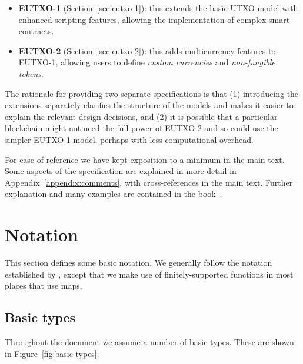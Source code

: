 \documentclass[a4paper]{article}
\begin{document}
\begin{itemize}
  \item \textbf{EUTXO-1} (Section~\ref{sec:eutxo-1}): this extends the
    basic UTXO model with enhanced scripting features, allowing the
    implementation of complex smart contracts.
  \item \textbf{EUTXO-2} (Section~\ref{sec:eutxo-2}): this adds
    multicurrency features to EUTXO-1, allowing users to define
    \textit{custom currencies} and \textit{non-fungible tokens}.
\end{itemize}


\medskip

The rationale for providing two separate specifications is that (1)
introducing the extensions separately clarifies the structure of the
models and makes it easier to explain the relevant design decisions,
and (2) it is possible that a particular blockchain might not need the
full power of EUTXO-2 and so could use the simpler EUTXO-1 model,
perhaps with less computational overhead.

\medskip

For ease of reference we have kept exposition to a minimum in the main
text.  Some aspects of the specification are explained in more detail
in Appendix~\ref{appendix:comments}, with cross-references in the main
text.  Further explanation and many examples are contained in the
book~\citep{Plutus-book}.


\section{Notation}
This section defines some basic notation.  We generally follow the
notation established by \citep{Zahnentferner18-UTxO}, except that we make use
of finitely-supported functions in most places that \citep{Zahnentferner18-UTxO}
use maps.

\subsection{Basic types}
\noindent Throughout the document we assume a number of basic types.
These are shown in Figure~\ref{fig:basic-types}.
\end{document}
